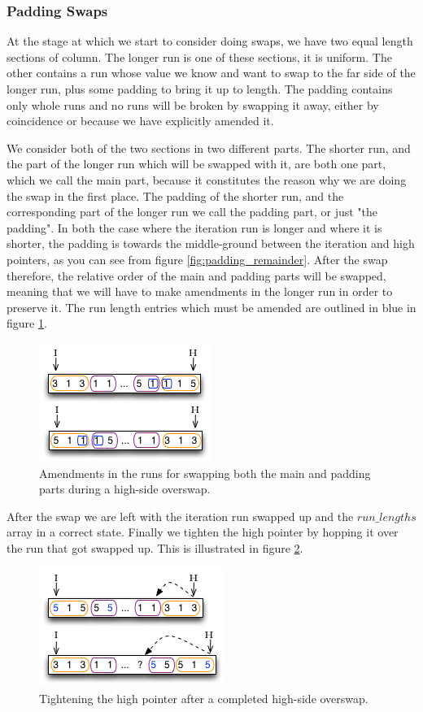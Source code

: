 \subsubsection{Padding Swaps}

At the stage at which we start to consider doing swaps, we have two equal length sections of column. The longer run is one of these sections, it is uniform. The other contains a run whose value we know and want to swap to the far side of the longer run, plus some padding to bring it up to length. The padding contains only whole runs and no runs will be broken by swapping it away, either by coincidence or because we have explicitly amended it.

We consider both of the two sections in two different parts. The shorter run, and the part of the longer run which will be swapped with it, are both one part, which we call the main part, because it constitutes the reason why we are doing the swap in the first place. The padding of the shorter run, and the corresponding part of the longer run we call the padding part, or just "the padding". In both the case where the iteration run is longer and where it is shorter, the padding is towards the middle-ground between the iteration and high pointers, as you can see from figure \ref{fig:padding_remainder}. After the swap therefore, the relative order of the main and padding parts will be swapped, meaning that we will have to make amendments in the longer run in order to preserve it. The run length entries which must be amended are outlined in blue in figure \ref{fig:padding_swaps_amendments}.

\begin{figure}[H]
  \centering
  \includegraphics[]{images/d23_padding_swaps_amendments}
  \caption{Amendments in the runs for swapping both the main and padding parts during a high-side overswap.}
  \label{fig:padding_swaps_amendments}
\end{figure}

After the swap we are left with the iteration run swapped up and the $run\_lengths$ array in a correct state. Finally we tighten the high pointer by hopping it over the run that got swapped up. This is illustrated in figure \ref{fig:padding_swaps_done}.

\begin{figure}[H]
  \centering
  \includegraphics[]{images/d25_padding_swaps_done}
  \caption{Tightening the high pointer after a completed high-side overswap.}
  \label{fig:padding_swaps_done}
\end{figure}